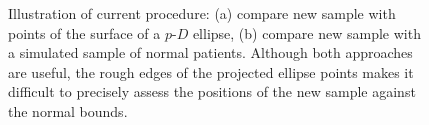 \documentclass[
  12pt,
]{interact}
\begin{document}
\begin{figure}

\begin{minipage}{0.50\linewidth}



\end{minipage}%
%
\begin{minipage}{0.50\linewidth}



\end{minipage}%

\caption{\label{fig-compare}Illustration of current procedure: (a)
compare new sample with points of the surface of a \(p\text{-}D\)
ellipse, (b) compare new sample with a simulated sample of normal
patients. Although both approaches are useful, the rough edges of the
projected ellipse points makes it difficult to precisely assess the
positions of the new sample against the normal bounds.}

\end{figure}%
\end{document}
